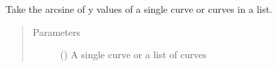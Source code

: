 \documentclass[letterpaper,10pt,english]{sphinxmanual}
\begin{document}
\begin{fulllineitems}
\label{\detokenize{pydv:pydvpy.asin}}
Take the arcsine of y values of a single curve or curves in a list.

\begin{sphinxVerbatim}[commandchars=\\\{\}]
  
\end{sphinxVerbatim}

\begin{sphinxVerbatim}[commandchars=\\\{\}]
\end{sphinxVerbatim}
\begin{quote}\begin{description}
\item[{Parameters}] \leavevmode
{} () \textendash{} A single curve or a list of curves

\end{description}\end{quote}

\end{fulllineitems}

\end{document}
